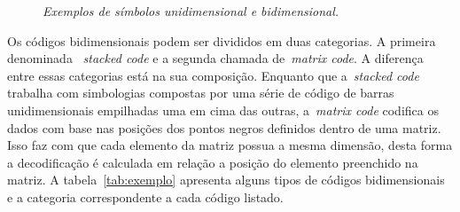 	\begin{figure}[htb]
		\centering
		\caption{\textit{Exemplos de símbolos unidimensional e bidimensional.}}
		\label{fig:simbolos} 
	\end{figure}
	
	Os códigos bidimensionais podem ser divididos em duas categorias. A primeira denominada
	~\textit{stacked code} e a segunda chamada de~\textit{matrix code}. A diferença entre essas
	categorias está na sua composição. Enquanto que a~\textit{stacked code} trabalha com simbologias
	compostas por uma série de código de barras unidimensionais empilhadas uma em cima das outras,
	a~\textit{matrix code} codifica os dados com base nas posições dos pontos negros definidos dentro
	de uma matriz. Isso faz com que cada elemento da matriz possua a mesma dimensão, desta forma a
	decodificação é calculada em relação a posição do elemento preenchido na matriz. A
	tabela~\ref{tab:exemplo} apresenta alguns tipos de códigos bidimensionais e a categoria
	correspondente a cada código listado.
	
